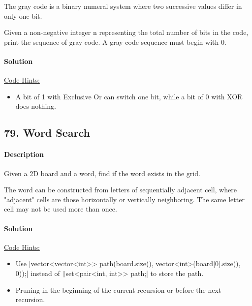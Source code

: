 The gray code is a binary numeral system where two successive values differ in only one bit.

Given a non-negative integer n representing the total number of bits in the code, print the sequence of gray code. A gray code sequence must begin with 0.

\paragraph{\color{white} \colorbox{OliveGreen}{Solution}}
\underline{Code Hints:}
\begin{itemize}
    \item A bit of 1 with Exclusive Or can switch one bit, while a bit of 0 with XOR does nothing.
\end{itemize}

\subsection{79. Word Search}

\paragraph{\color{white} \colorbox{Mahogany}{Description}}

Given a 2D board and a word, find if the word exists in the grid.

The word can be constructed from letters of sequentially adjacent cell, where "adjacent" cells are those horizontally or vertically neighboring. The same letter cell may not be used more than once.

\paragraph{\color{white} \colorbox{OliveGreen}{Solution}}
\underline{Code Hints:}
\begin{itemize}
    \item Use |vector<vector<int>> path(board.size(), vector<int>(board[0].size(), 0));| instead of \texttt|set<pair<int, int>> path;| to store the path.
    \item Pruning in the beginning of the current recursion or before the next recursion.
\end{itemize}